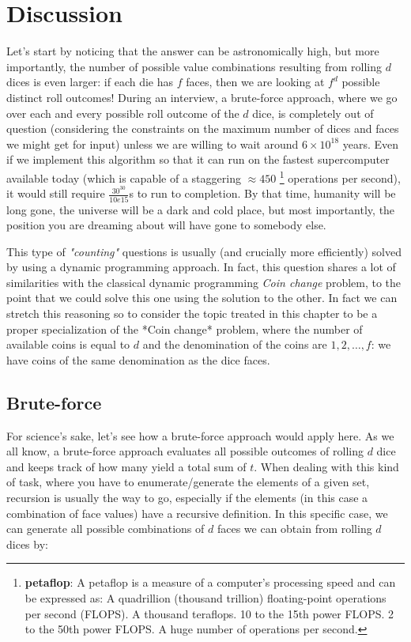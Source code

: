 \section{Discussion}
\label{dice_rolls:sec:discussion}

Let's start by noticing that the answer can be astronomically high, but more importantly, the number of possible value combinations resulting from rolling $d$ dices is even larger: if each die has
$f$ faces, then we are looking at $f^d$ possible distinct roll outcomes! 
During an interview, a brute-force approach, where we go over each and every possible roll outcome of the $d$ dice, is completely out of question  (considering the constraints on the maximum number of dices and faces we might get for input) unless we are willing to wait around  $6 \times 10^{18}$ years. Even if we implement this algorithm so that it can run on the fastest supercomputer available today (which is capable of a staggering $\approx450$ \footnote{\textbf{petaflop}: A petaflop is a measure of a computer's processing speed and can be expressed as: A quadrillion (thousand trillion) floating-point operations per second (FLOPS). A thousand teraflops. 10 to the 15th power FLOPS. 2 to the 50th power FLOPS. A huge number of operations per second.} operations per second), it would still require $\frac{30^{30}}{10e15}$s to run to completion. By that time, humanity will be long gone, the universe will be a dark and cold place, but most importantly, the position you are dreaming about will have gone to somebody else.

This type of \textit{"counting"} questions is usually (and crucially more efficiently) solved by using a dynamic programming
approach. In fact, this question shares a lot of similarities with the classical dynamic programming
\textit{Coin change} problem, to the point that we
could solve this one using the solution to the other. In fact we can stretch this reasoning so to consider the topic treated in this chapter to be a proper specialization of the *Coin
change* problem, where the number of available coins is equal to $d$
and the denomination of the coins are $1,2,\ldots,f$: we have coins of the same denomination as the
dice faces.




\subsection{Brute-force}
\label{dice_rolls:sec:bruteforce}


For science's sake, let's see how a brute-force approach would apply here. As we all know, a brute-force approach evaluates all possible outcomes of rolling $d$ dice and keeps
track of how many yield a total sum of $t$. When dealing with this kind of task, where you have to
enumerate/generate the elements of a given set, recursion is usually the way to go, especially if the elements (in this case a combination of face values) have a recursive definition.
In this specific case, we can generate all possible combinations of $d$ faces we can obtain from rolling $d$ dices by:

